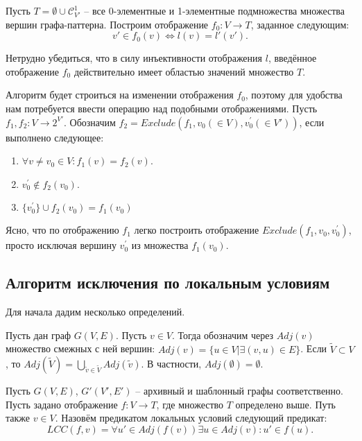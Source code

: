 Пусть $T = \emptyset \cup \mathcal{C}_{V'}^1$ -- все 0-элементные и 1-элементные подмножества множества вершин графа-паттерна. Построим отображение $f_0 : V \to T$, заданное следующим:
\begin{equation}
v' \in f_0(v) \Leftrightarrow l(v) = l'(v').
\end{equation}

Нетрудно убедиться, что в силу инъективности отображения $l$, введённое отображение $f_0$ действительно имеет областью значений множество $T$.

Алгоритм будет строиться на изменении отображения $f_0$, поэтому для удобства нам потребуется ввести операцию над подобными отображениями. Пусть $f_1, f_2 : V \to 2^{V'}$. Обозначим $f_2 = Exclude(f_1, v_0 (\in V), v^{\prime}_0 (\in V'))$, если выполнено следующее:
\begin{enumerate}
	\item $\forall v \ne v_0 \in V: f_1(v) = f_2(v)$.
	\item $v^{\prime}_0 \notin f_2(v_0)$.
	\item $\{v^{\prime}_0\} \cup f_2(v_0) = f_1(v_0)$
\end{enumerate}

Ясно, что по отображению $f_1$ легко построить отображение $Exclude(f_1, v_0, v^{\prime}_0)$, просто исключая вершину $v^{\prime}_0$ из множества $f_1(v_0)$.

\subsection{Алгоритм исключения по локальным условиям}

Для начала дадим несколько определений.

\begin{defn}
	Пусть дан граф $G(V, E)$. Пусть $v \in V$. Тогда обозначим через $Adj(v)$ множество смежных с ней вершин: $Adj(v) = \{u \in V | \exists (v, u) \in E \}$. Если $\widetilde{V} \subset V$, то $Adj(\widetilde{V}) = \bigcup\limits_{\widetilde{v} \in \widetilde{V}} Adj(\widetilde{v})$. В частности, $Adj(\emptyset) = \emptyset$.
\end{defn} 

\begin{defn}
	Пусть $G(V, E)$, $G'(V', E')$ -- архивный и шаблонный графы соответственно. Пусть задано отображение $f : V \to T$, где множество $T$ определено выше. Путь также $v \in V$. Назовём предикатом локальных условий следующий предикат:
	\begin{equation}
		LCC(f, v) = \forall u' \in Adj(f(v)) \exists u \in Adj(v) : u' \in f(u).
	\end{equation} 
\end{defn} 

